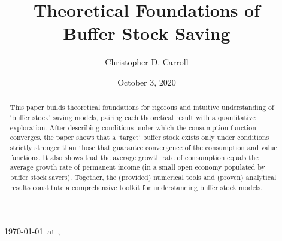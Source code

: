 \documentclass[BufferStockTheory]{subfiles}
\begin{document}
\providecommand{\versn}{} %
\ifthenelse{\boolean{ifWeb}}{  \renewcommand{\ushort}{\underline}\renewcommand{\versn}{Web} }{} %

\hfill{\tiny \jobname~\versn~\today~{at} \DTMcurrenttime, ~~}


\title{Theoretical Foundations of \\ Buffer Stock Saving}

\author{Christopher D. Carroll\authNum}



\renewcommand{\forcedate}{October 3, 2020}
\date{\forcedate}

\maketitle %
\hypertarget{abstract}{}
\begin{abstract}
  This paper builds theoretical foundations for rigorous and intuitive understanding of `buffer stock' saving models, pairing each theoretical result with a quantitative exploration.  After describing conditions under which the consumption function converges, the paper shows that a `target' buffer stock exists only under conditions strictly stronger than those that guarantee convergence of the consumption and value functions.  It also shows that the average growth rate of consumption equals the average growth rate of permanent income (in a small open economy populated by buffer stock savers).  Together, the (provided) numerical tools and (proven) analytical results constitute a comprehensive toolkit for understanding buffer stock models.
\end{abstract}
\end{document}
